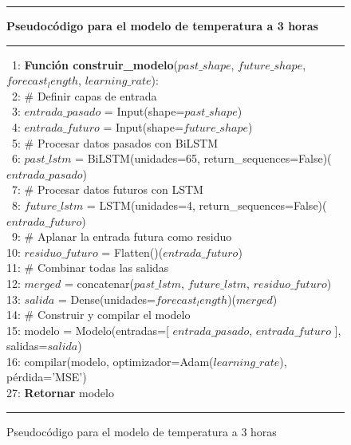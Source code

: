 \begin{figure}[H]
{\small
\hrule
{\bf\small Pseudocódigo para el modelo de temperatura a 3 horas}
\hrule
\begin{center}
\begin{tabbing}
\ 1: {\bf Fun}\={\bf ción construir\_modelo}($past\_shape$, $future\_shape$, $forecast_length$, $learning\_rate$): \\
\ 2: \> \# Definir capas de entrada \\
\ 3: \> $entrada\_pasado$ = Input(shape=$past\_shape$) \\
\ 4: \> $entrada\_futuro$ = Input(shape=$future\_shape$) \\
\ 5: \> \# Procesar datos pasados con BiLSTM \\
\ 6: \> $past\_lstm$ = BiLSTM(unidades=65, return\_sequences=False)($entrada\_pasado$) \\
\ 7: \> \# Procesar datos futuros con LSTM \\
\ 8: \> $future\_lstm$ = LSTM(unidades=4, return\_sequences=False)($entrada\_futuro$) \\
\ 9: \> \# Aplanar la entrada futura como residuo \\
10: \> $residuo\_futuro$ = Flatten()($entrada\_futuro$) \\
11: \> \# Combinar todas las salidas \\
12: \> $merged$ = concatenar($past\_lstm$, $future\_lstm$, $residuo\_futuro$) \\
13: \> $salida$ = Dense(unidades=$forecast_length$)($merged$) \\
14: \> \# Construir y compilar el modelo \\
15: \> modelo = Modelo(entradas=[ $entrada\_pasado$, $entrada\_futuro$ ], salidas=$salida$) \\
16: \> compilar(modelo, optimizador=Adam($learning\_rate$), pérdida='MSE') \\
27: \> {\bf Retornar} modelo \\
\end{tabbing}
\end{center}
}
\hrule
\caption{Pseudocódigo para el modelo de temperatura a 3 horas}
\label{lstm_model_temp_3h}
\end{figure}

